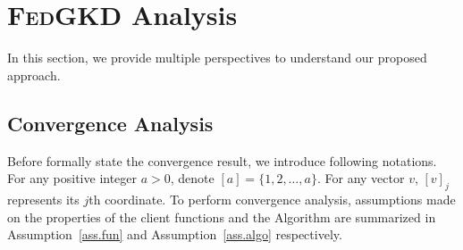 \documentclass{article} %
\newcommand{\w}{\boldsymbol{w}}
\newcommand{\R}[1]{\mathbb{R}^{#1}}
\newcommand{\system}{\textsc{FedGKD}\xspace}
\begin{document}
\section{\system Analysis}
In this section, we provide multiple perspectives to understand our proposed approach.

\subsection{Convergence Analysis}

Before formally state the convergence result, we introduce following notations. For any positive integer $a>0$, denote $[a]=\{1, 2,\ldots, a\}$. For any vector $v$, $[v]_j$ represents its $j$th coordinate. To perform convergence analysis, assumptions made on the properties of the client functions and the Algorithm are summarized in Assumption~\ref{ass.fun} and Assumption~\ref{ass.algo} respectively.

 
\end{document}
